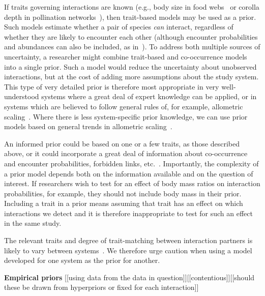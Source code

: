 \documentclass[12pt]{article}
\begin{document}
\begin{spacing}{2.0}
        If traits governing interactions are known (e.g., body size in food webs~\citep{Gravel2013} or corolla depth in pollination networks~\citep{Weinstein2017a}), then trait-based models may be used as a prior. Such models estimate whether a pair of species \emph{can} interact, regardless of whether they are likely to encounter each other (although encounter probabilities and abundances can also be included, as in~\citet{Graham2018}). To address both multiple sources of uncertainty, a researcher might combine trait-based and co-occurrence models into a single prior. Such a model would reduce the uncertainty about unobserved interactions, but at the cost of adding more assumptions about the study system. This type of very detailed prior is therefore most appropriate in very well-understood systems where a great deal of expert knowledge can be applied, or in systems which are believed to follow general rules of, for example, allometric scaling~\citep{Gravel2013}. Where there is less system-specific prior knowledge, we can use prior models based on general trends in allometric scaling~\citep{Riede2011,Gravel2013}.


        An informed prior could be based on one or a few traits, as those described above, or it could incorporate a great deal of information about co-occurrence and encounter probabilities, forbidden links, etc.~\citep{Jordano2016}. Importantly, the complexity of a prior model depends both on the information available and on the question of interest. If researchers wish to test for an effect of body mass ratios on interaction probabilities, for example, they should not include body mass in their prior. Including a trait in a prior means assuming that trait has an effect on which interactions we detect and it is therefore inappropriate to test for such an effect in the same study.


        The relevant traits and degree of trait-matching between interaction partners is likely to vary between systems~\citep{Gravel2013,Weinstein2017a}. We therefore urge caution when using a model developed for one system as the prior for another. 


      \textbf{Empirical priors} [[using data from the data in question]][[contentious]][[should these be drawn from hyperpriors or fixed for each interaction]]



\end{spacing}
\end{document}
